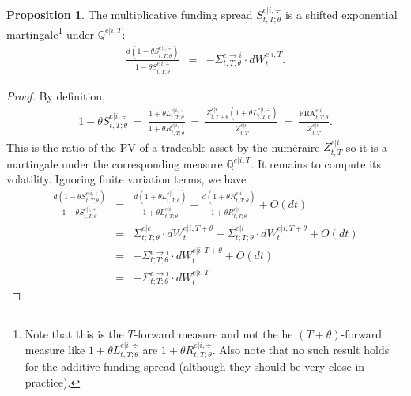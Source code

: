 \documentclass[11pt,english]{amsart}
\newcommand{\QQ}{\mathbb{Q}}
\theoremstyle{definition}
\newtheorem{prop}{Proposition}
\begin{document}
\begin{prop}
The multiplicative funding spread $S^{e|i,\div}_{t,T;\theta}$ is a shifted exponential martingale\footnote{Note that this is the $T$-forward measure and not the  he $(T+\theta)$-forward measure like $1+\theta L^{e|i,\div}_{t,T;\theta}$ are $1+\theta R^{e|i,\div}_{t,T;\theta}$. Also note that no such result holds for the additive funding spread (although they should be very close in practice).} under $\QQ^{e|i,T}$: 
\begin{eqnarray}
  \frac{d(1 - \theta S^{e|i,\div}_{t,T;\theta})}{1 - \theta S^{e|i,\div}_{t,T;\theta}} 	
  &=& -\Sigma^{e\to i}_{t,T;\theta} \cdot dW^{e|i,T}_t .
\end{eqnarray} 
\end{prop}


\begin{proof}
By definition, 
\begin{eqnarray}
  1 - \theta S^{e|i,\div}_{t,T;\theta}
  ~=~  \frac{1+\theta L^{e|i,\div}_{t,T;\theta}}{1+\theta R^{e|i,\div}_{t,T;\theta}}  
  ~=~  \frac{Z^{e|i}_{t,T+\theta}(1+\theta L^{e|i,\div}_{t,T;\theta})}{Z^{e|i}_{t,T}} 
  ~=~  \frac{\mathrm{FRA}^{e|i}_{t,T;\theta}}{Z^{e|i}_{t,T}}  .
\end{eqnarray} 
This is the ratio of the PV of a tradeable asset by the num\'eraire $Z^{e|i}_{t,T}$ so it is a martingale under the corresponding measure $\QQ^{e|i,T}$. It remains to compute its volatility. Ignoring finite variation terms, we have
\begin{eqnarray*}
  \frac{d(1 - \theta S^{e|i,\div}_{t,T;\theta})}{1 - \theta S^{e|i,\div}_{t,T;\theta}} 	
  &=& \frac{d(1 + \theta L^{e|i}_{t,T;\theta})}{1 + \theta L^{e|i}_{t,T;\theta}}  - \frac{d(1 + \theta R^{e|i}_{t,T;\theta})}{1 + \theta R^{e|i}_{t,T;\theta}}  + O(dt) \\
  &=& \Sigma^{e|e}_{t;T;\theta} \cdot dW^{e|i,T+\theta}_t  - \Sigma^{e|i}_{t;T;\theta} \cdot dW^{e|i,T+\theta}_t + O(dt) \\
  &=& - \Sigma^{e \to i}_{t;T;\theta} \cdot dW^{e|i,T+\theta}_t  + O(dt) \\
  &=& - \Sigma^{e \to i}_{t;T;\theta} \cdot dW^{e|i,T}_t 
\end{eqnarray*} 
\end{proof}
\end{document}
